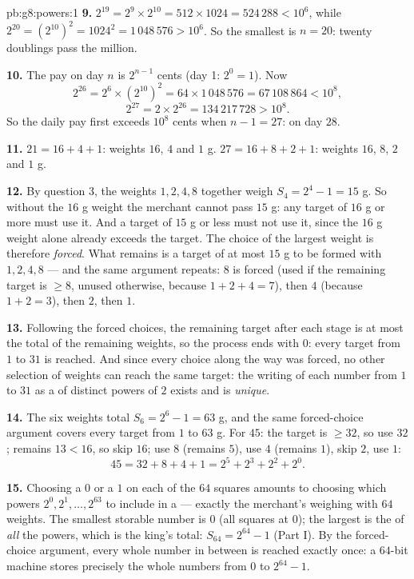 \begin{solution}{pb:g8:powers:1}
\textbf{9.} $2^{19} = 2^9 \times 2^{10} = 512 \times 1024 =
524\,288 < 10^6$, while $2^{20} = \left(2^{10}\right)^2 =
1024^2 = 1\,048\,576 > 10^6$. So the smallest  is
$n = 20$: twenty doublings pass the million.

\textbf{10.} The pay on day $n$ is $2^{n-1}$ cents (day 1:
$2^0 = 1$). Now
\[
2^{26} = 2^6 \times \left(2^{10}\right)^2
= 64 \times 1\,048\,576 = 67\,108\,864 < 10^8,
\]
\[
2^{27} = 2 \times 2^{26} = 134\,217\,728 > 10^8 .
\]
So the daily pay first exceeds $10^8$ cents when $n - 1 = 27$:
on day $28$.

\textbf{11.} $21 = 16 + 4 + 1$: weights $16$, $4$ and $1$ g.
$27 = 16 + 8 + 2 + 1$: weights $16$, $8$, $2$ and $1$ g.

\textbf{12.} By question 3, the weights $1, 2, 4, 8$ together
weigh $S_4 = 2^4 - 1 = 15$ g. So without the $16$ g weight the
merchant cannot pass $15$ g: any target of $16$ g or more must
use it. And a target of $15$ g or less must not use it, since the
$16$ g weight alone already exceeds the target. The choice of the
largest weight is therefore \emph{forced}. What remains is a
target of at most $15$ g to be formed with $1, 2, 4, 8$ --- and
the same argument repeats: $8$ is forced (used if the remaining
target is $\geq 8$, unused otherwise, because $1 + 2 + 4 = 7$),
then $4$ (because $1 + 2 = 3$), then $2$, then $1$.

\textbf{13.} Following the forced choices, the remaining target
after each stage is at most the total of the remaining weights,
so the process ends with  $0$: every target from $1$ to
$31$ is reached. And since every choice along the way was forced,
no other selection of weights can reach the same target: the
writing of each number from $1$ to $31$ as a  of distinct
powers of $2$ exists and is \emph{unique}.

\textbf{14.} The six weights total $S_6 = 2^6 - 1 = 63$ g, and
the same forced-choice argument covers every target from $1$ to
$63$ g. For $45$: the target is $\geq 32$, so use $32$; remains
$13 < 16$, so skip $16$; use $8$ (remains $5$), use $4$ (remains
$1$), skip $2$, use $1$:
\[
45 = 32 + 8 + 4 + 1 = 2^5 + 2^3 + 2^2 + 2^0 .
\]

\textbf{15.} Choosing a $0$ or a $1$ on each of the $64$ squares
amounts to choosing which powers $2^0, 2^1, \dots, 2^{63}$ to
include in a  --- exactly the merchant's weighing with $64$
weights. The smallest storable number is $0$ (all squares at
$0$); the largest is the  of \emph{all} the powers, which is
the king's total: $S_{64} = 2^{64} - 1$ (Part I). By the
forced-choice argument, every whole number in between is reached
exactly once: a $64$-bit machine stores precisely the whole
numbers from $0$ to $2^{64} - 1$.
\end{solution}
